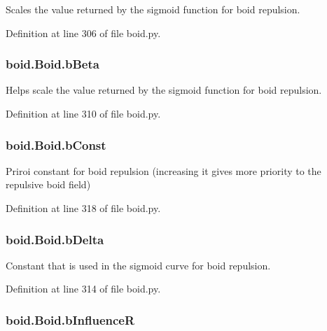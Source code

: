 Scales the value returned by the sigmoid function for boid repulsion. 



Definition at line 306 of file boid.\-py.

\hypertarget{classboid_1_1Boid_a1a48be012c505eea2e1b9f110d9bd5f3}{
\subsubsection[{b\-Beta}]{\setlength{\rightskip}{0pt plus 5cm}boid.\-Boid.\-b\-Beta}}\label{classboid_1_1Boid_a1a48be012c505eea2e1b9f110d9bd5f3}


Helps scale the value returned by the sigmoid function for boid repulsion. 



Definition at line 310 of file boid.\-py.

\hypertarget{classboid_1_1Boid_a868b1d8e6fadd2b1beedc1a9f23edde5}{
\subsubsection[{b\-Const}]{\setlength{\rightskip}{0pt plus 5cm}boid.\-Boid.\-b\-Const}}\label{classboid_1_1Boid_a868b1d8e6fadd2b1beedc1a9f23edde5}


Priroi constant for boid repulsion (increasing it gives more priority to the repulsive boid field) 



Definition at line 318 of file boid.\-py.

\hypertarget{classboid_1_1Boid_afebd87123c129406ee9e8c99f85f66a7}{
\subsubsection[{b\-Delta}]{\setlength{\rightskip}{0pt plus 5cm}boid.\-Boid.\-b\-Delta}}\label{classboid_1_1Boid_afebd87123c129406ee9e8c99f85f66a7}


Constant that is used in the sigmoid curve for boid repulsion. 



Definition at line 314 of file boid.\-py.

\hypertarget{classboid_1_1Boid_ae1a1d62fdc0e9014df5fcb1a49d37342}{
\subsubsection[{b\-Influence\-R}]{\setlength{\rightskip}{0pt plus 5cm}boid.\-Boid.\-b\-Influence\-R}}\label{classboid_1_1Boid_ae1a1d62fdc0e9014df5fcb1a49d37342}


